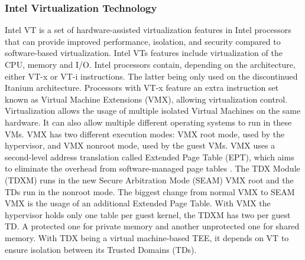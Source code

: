 \subsubsection{Intel Virtualization Technology}
Intel VT is a set of hardware-assisted virtualization features in Intel processors that can provide improved performance, isolation, and security compared to software-based virtualization. Intel VTs features include virtualization of the CPU, memory and I/O.
Intel processors contain, depending on the architecture, either VT-x or VT-i instructions. The latter being only used on the discontinued Itanium architecture. Processors with VT-x feature an extra instruction set known as Virtual Machine Extensions (VMX), allowing virtualization control. Virtualization allows the usage of multiple isolated Virtual Machines on the same hardware. It can also allow multiple different operating systems to run in these VMs\cite{intel_corporation_intel_nodate}. VMX has two different execution modes: VMX root mode, used by the hypervisor, and VMX nonroot mode, used by the guest VMs. VMX uses a second-level address translation called Extended Page Table (EPT), which aims to eliminate the overhead from software-managed page tables \cite{uhlig_intel_2005}. The TDX Module (TDXM) runs in the new Secure Arbitration Mode (SEAM) VMX root and the TDs run in the nonroot mode. The biggest change from normal VMX to SEAM VMX is the usage of an additional Extended Page Table. With VMX the hypervisor holds only one table per guest kernel, the TDXM has two per guest TD. A protected one for private memory and another unprotected one for shared memory.
With TDX being a virtual machine-based TEE, it depends on VT to ensure isolation between its Trusted Domains (TDs)\cite{cheng_intel_2023}.

